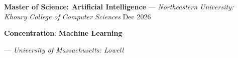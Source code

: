 \textbf{Master of Science: Artificial Intelligence} — \textit{Northeastern University: Khoury College of Computer Sciences}	\hfill Dec 2026

\hspace{0.25cm} \textbf{Concentration}: \textbf{Machine Learning} \hfill 

 — \textit{University of Massachusetts: Lowell}





